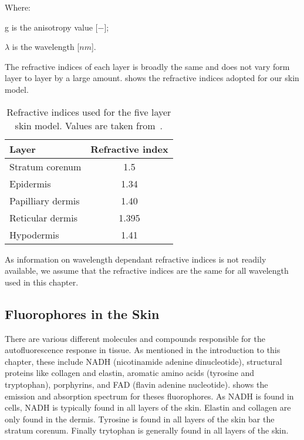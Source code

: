 \noindent Where:

\indent g is the anisotropy value [$-$];

\indent $\lambda$ is the wavelength [$nm$].

The refractive indices of each layer is broadly the same and does not vary form layer to layer by a large amount.
 shows the refractive indices adopted for our skin model.

\begin{table}[!htpb]
  \centering

  \begin{tabular}{l|c}
  \hline

  \hline
  Layer & Refractive index \\
  \hline
    Stratum corenum & 1.5 \\
    Epidermis &  1.34\\
    Papilliary dermis & 1.40 \\
    Reticular dermis &  1.395\\
    Hypodermis &  1.41\\

  \hline
  \end{tabular}
    \caption{Refractive indices used for the five layer skin model. Values are taken from~\cite{meglinski2002quantitative}.}
  \label{tab:refindex}
\end{table}

As information on wavelength dependant refractive indices is not readily available, we assume that the refractive indices are the same for all wavelength used in this chapter.

\subsection*{Fluorophores in the Skin}

There are various different molecules and compounds responsible for the autofluorescence response in tissue.
As mentioned in the introduction to this chapter, these include NADH (nicotinamide adenine dinucleotide), structural proteins like collagen and elastin, aromatic amino acids (tyrosine and tryptophan), porphyrins, and FAD (flavin adenine nucleotide).
 shows the emission and absorption spectrum for theses fluorophores.
As NADH is found in cells, NADH is typically found in all layers of the skin.
Elastin and collagen are only found in the dermis.
Tyrosine is found in all layers of the skin bar the stratum corenum.
Finally trytophan is generally found in all layers of the skin.


